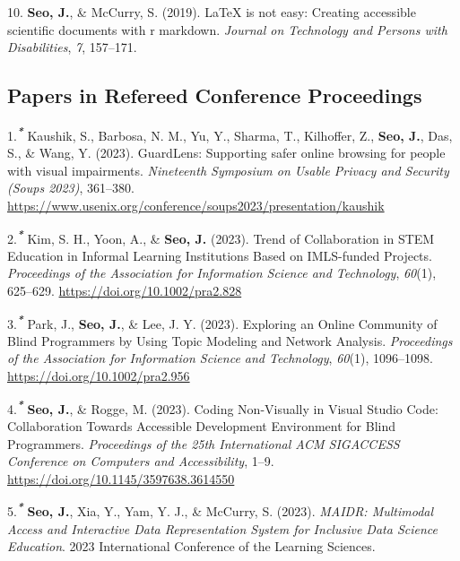 \documentclass[11pt,a4paper,]{awesome-cv}
\begin{document}
\leavevmode\hypertarget{ref-seo2019arow}{}%
10. \textbf{Seo, J.}, \& McCurry, S. (2019). LaTeX is not easy: Creating
accessible scientific documents with r markdown. \emph{Journal on
Technology and Persons with Disabilities}, \emph{7}, 157--171.

\hypertarget{papers-in-refereed-conference-proceedings}{%
\subsection{Papers in Refereed Conference
Proceedings}\label{papers-in-refereed-conference-proceedings}}

\hypertarget{bibliography}{}
\leavevmode\hypertarget{ref-289508}{}%
1.\textsuperscript{\emph{\textbf{*}}} Kaushik, S., Barbosa, N. M., Yu,
Y., Sharma, T., Kilhoffer, Z., \textbf{Seo, J.}, Das, S., \& Wang, Y.
(2023). GuardLens: Supporting safer online browsing for people with
visual impairments. \emph{Nineteenth Symposium on Usable Privacy and
Security (Soups 2023)}, 361--380.
\url{https://www.usenix.org/conference/soups2023/presentation/kaushik}

\leavevmode\hypertarget{ref-kimTrendCollaborationSTEM2023a}{}%
2.\textsuperscript{\emph{\textbf{*}}} Kim, S. H., Yoon, A., \&
\textbf{Seo, J.} (2023). Trend of Collaboration in STEM Education in
Informal Learning Institutions Based on IMLS-funded Projects.
\emph{Proceedings of the Association for Information Science and
Technology}, \emph{60}(1), 625--629.
\url{https://doi.org/10.1002/pra2.828}

\leavevmode\hypertarget{ref-parkExploringOnlineCommunity2023}{}%
3.\textsuperscript{\emph{\textbf{*}}} Park, J., \textbf{Seo, J.}, \&
Lee, J. Y. (2023). Exploring an Online Community of Blind Programmers by
Using Topic Modeling and Network Analysis. \emph{Proceedings of the
Association for Information Science and Technology}, \emph{60}(1),
1096--1098. \url{https://doi.org/10.1002/pra2.956}

\leavevmode\hypertarget{ref-seoCodingNonVisuallyVisual2023}{}%
4.\textsuperscript{\emph{\textbf{*}}} \textbf{Seo, J.}, \& Rogge, M.
(2023). Coding Non-Visually in Visual Studio Code: Collaboration Towards
Accessible Development Environment for Blind Programmers.
\emph{Proceedings of the 25th International ACM SIGACCESS Conference on
Computers and Accessibility}, 1--9.
\url{https://doi.org/10.1145/3597638.3614550}

\leavevmode\hypertarget{ref-seoMAIDRMultimodalAccessInPress}{}%
5.\textsuperscript{\emph{\textbf{*}}} \textbf{Seo, J.}, Xia, Y., Yam, Y.
J., \& McCurry, S. (2023). \emph{MAIDR: Multimodal Access and
Interactive Data Representation System for Inclusive Data Science
Education}. 2023 International Conference of the Learning Sciences.
\end{document}
